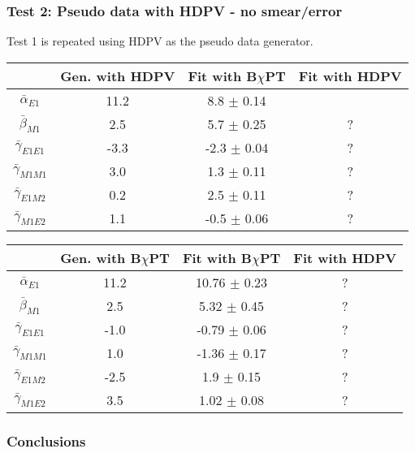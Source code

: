 \documentclass[]{article}
\begin{document}
\subsubsection{Test 2: Pseudo data with HDPV - no smear/error} \label{Sec:Pseudo2}

Test 1 is repeated using HDPV as the pseudo data generator. 

\begin{table}[h!]
	\centering %
	\begin{tabular}{|c|c|c|c|} %
		\hline %
		& Gen. with HDPV & Fit with B$\chi$PT & Fit with HDPV\\
		\hline\hline
		$\bar{\alpha}_{E1}$   & 11.2 & 8.8 $\pm$ 0.14 &  \\
		$\bar{\beta}_{M1}$    & 2.5  & 5.7 $\pm$ 0.25 & ?\\
		$\bar{\gamma}_{E1E1}$ & -3.3 & -2.3 $\pm$ 0.04 & ? \\
		$\bar{\gamma}_{M1M1}$ & 3.0  & 1.3 $\pm$ 0.11 & ? \\
		$\bar{\gamma}_{E1M2}$ & 0.2  & 2.5 $\pm$ 0.11 & ?\\
		$\bar{\gamma}_{M1E2}$ & 1.1  & -0.5 $\pm$ 0.06 & ?\\[0.5ex]
		\hline
	\end{tabular}
\end{table}


\begin{table}[h!]
	\centering %
	\begin{tabular}{|c|c|c|c|} %
		\hline %
		& Gen. with B$\chi$PT & Fit with B$\chi$PT & Fit with HDPV\\
		\hline\hline
		$\bar{\alpha}_{E1}$   & 11.2 & 10.76 $\pm$ 0.23 & ? \\
		$\bar{\beta}_{M1}$    & 2.5  & 5.32 $\pm$ 0.45 & ?\\
		$\bar{\gamma}_{E1E1}$ & -1.0 & -0.79 $\pm$ 0.06 & ? \\
		$\bar{\gamma}_{M1M1}$ & 1.0  & -1.36 $\pm$ 0.17 & ? \\
		$\bar{\gamma}_{E1M2}$ & -2.5 & 1.9   $\pm$ 0.15 & ?\\
		$\bar{\gamma}_{M1E2}$ & 3.5  & 1.02 $\pm$ 0.08 & ?\\[0.5ex]
		\hline
	\end{tabular}
\end{table}

\subsubsection{Conclusions}
\end{document}
